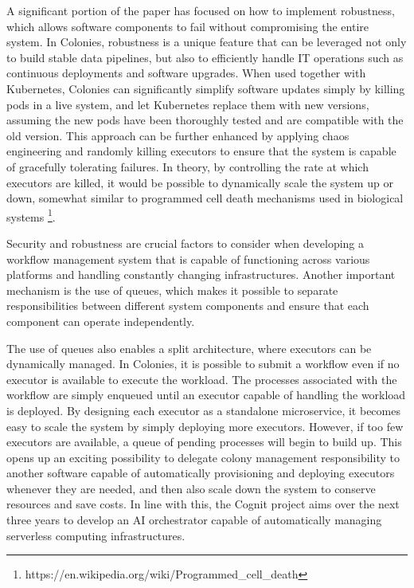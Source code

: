 \documentclass{article}
\begin{document}
A significant portion of the paper has focused on how to implement robustness, which allows software components to fail without compromising the entire system. In Colonies, robustness is a unique feature that can be leveraged not only to build stable data pipelines, but also to efficiently handle IT operations such as continuous deployments and software upgrades. When used together with Kubernetes, Colonies can significantly simplify software updates simply by killing pods in a live system, and let Kubernetes replace them with new versions, assuming the new pods have been thoroughly tested and are compatible with the old version. This approach can be further enhanced by applying chaos engineering and randomly killing executors to ensure that the system is capable of gracefully tolerating failures. In theory, by controlling the rate at which executors are killed, it would be possible to dynamically scale the system up or down, somewhat similar to programmed cell death mechanisms used in biological systems \footnote{https://en.wikipedia.org/wiki/Programmed\_cell\_death}. 

Security and robustness are crucial factors to consider when developing a workflow management system that is capable of functioning across various platforms and handling constantly changing infrastructures. Another important mechanism is the use of queues, which makes it possible to separate responsibilities between different system components and ensure that each component can operate independently. 

The use of queues also enables a split architecture, where executors can be dynamically managed. In Colonies, it is possible to submit a workflow even if no executor is available to execute the workload. The processes associated with the workflow are simply enqueued until an executor capable of handling the workload is deployed. By designing each executor as a standalone microservice, it becomes easy to scale the system by simply deploying more executors. However, if too few executors are available, a queue of pending processes will begin to build up. This opens up an exciting possibility to delegate colony management responsibility to another software capable of automatically provisioning and deploying executors whenever they are needed, and then also scale down the system to conserve resources and save costs. In line with this, the Cognit project \cite{cognit} aims over the next three years to develop an AI orchestrator capable of automatically managing serverless computing infrastructures.
\end{document}
